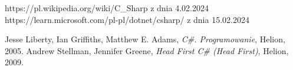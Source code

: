 \documentclass[polish,12pt,twoside,a4paper]{report}
\begin{document}




\newpage

\newpage

\newpage

\newpage

\newpage

\newpage

\newpage

\newpage

\begin{thebibliography}{6}

 https://pl.wikipedia.org/wiki/C\_Sharp z dnia 4.02.2024
 https://learn.microsoft.com/pl-pl/dotnet/csharp/ z dnia 15.02.2024

Jesse Liberty, Ian Griffiths, Matthew E. Adams, {\it C\#. Programowanie}, Helion,  2005.
Andrew Stellman, Jennifer Greene, {\it Head First C\# (Head First)}, Helion,  2009.
\end{thebibliography}
\newpage


\end{document}
